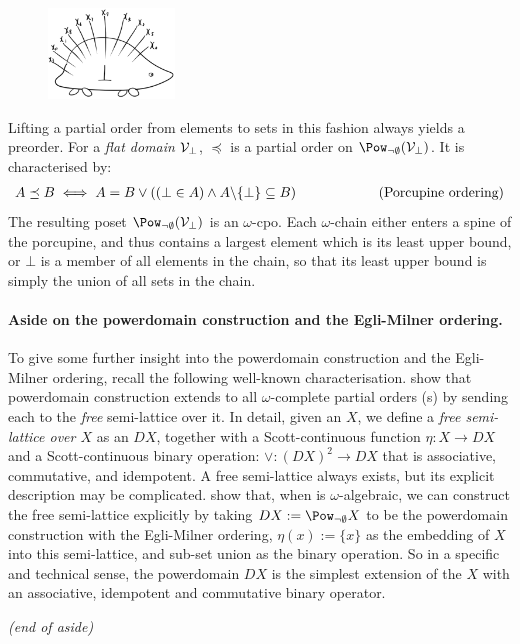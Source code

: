 \begin{figure}
  \vspace{-25pt}
  \begin{center}
    \includegraphics[width=0.3\textwidth]{porcupine.png}
  \end{center}
\end{figure}%

\noindent Lifting a partial order from elements to sets in this
fashion always yields a preorder. For a \emph{flat domain} $\mathcal{V}_\bot$, $\preceq$ is a partial order on
$\Pow_{\neg \emptyset}(\V_\bot)$. It is characterised by:
\begin{align*}
     &A \preceq B \iff  A = B \lor ((\bot \in A) \land A {\setminus} \{\bot\} \subseteq B)  &\qquad\qquad\quad\text{\centering(Porcupine ordering)}
\end{align*}
The resulting poset $\Pow_{\neg \emptyset}(\V_\bot)$ is an $\omega$-cpo.
Each $\omega$-chain either enters a spine of the
porcupine, and thus contains a largest element which is its least upper bound,
or $\bot$ is a member of all elements in the chain, so that its least upper bound is simply the union of all sets in the chain.

\paragraph*{Aside on the powerdomain construction and the Egli-Milner ordering.}
To give some further insight into the powerdomain construction and the Egli-Milner ordering, recall the following well-known characterisation. \citet[Remark after Lemma~3.5]{hennessy-plotkin:plotkin-powerdomain} show that
 powerdomain construction extends to all
$\omega$-complete partial orders (\wcpo{}s) by sending each \wcpo{} to
the \emph{free} semi-lattice over it. In detail, given an \wcpo{} $X$,
we define a \emph{free semi-lattice over $X$} as an \wcpo{} $DX$,
together with a Scott-continuous function $\eta : X \to DX$ and a
Scott-continuous binary operation: $\vee : (DX)^2 \to DX$ that is
associative, commutative, and idempotent. A free semi-lattice always
exists, but its explicit description may be complicated.
\citeauthor{hennessy-plotkin:plotkin-powerdomain} show that, when
\wcpo{} is $\omega$-algebraic, we can construct the free semi-lattice
explicitly by taking $DX := \Pow_{\lnot \emptyset}X$ to be the
powerdomain construction with the Egli-Milner ordering, $\eta(x) :=
\{x\}$ as the embedding of $X$ into this semi-lattice, and sub-set
union as the binary operation.  So in a specific and technical sense,
the powerdomain $DX$ is the simplest extension of the \wcpo{} $X$ with
an associative, idempotent and commutative binary operator.
\begin{flushright}
\vspace*{-1em}
	\textit{(end of aside)}
\end{flushright}

